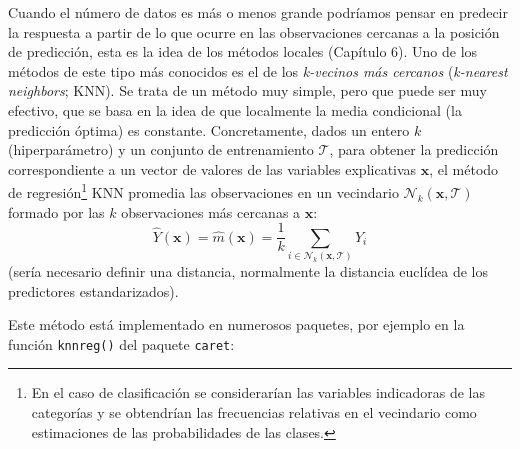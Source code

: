 \documentclass[
]{book}
\theoremstyle{break}
\theoremstyle{definition}
\theoremstyle{definition}
\theoremstyle{definition}
\theoremstyle{remark}
\begin{document}
Cuando el número de datos es más o menos grande podríamos pensar en predecir la respuesta a partir de lo que ocurre en las observaciones cercanas a la posición de predicción, esta es la idea de los métodos locales (Capítulo 6).
Uno de los métodos de este tipo más conocidos es el de los \emph{k-vecinos más cercanos} (\emph{k-nearest neighbors}; KNN).
Se trata de un método muy simple, pero que puede ser muy efectivo, que se basa en la idea de que localmente la media condicional (la predicción óptima) es constante.
Concretamente, dados un entero \(k\) (hiperparámetro) y un conjunto de entrenamiento \(\mathcal{T}\), para obtener la predicción correspondiente a un vector de valores de las variables explicativas \(\mathbf{x}\), el método de regresión\footnote{En el caso de clasificación se considerarían las variables indicadoras de las categorías y se obtendrían las frecuencias relativas en el vecindario como estimaciones de las probabilidades de las clases.} KNN promedia las observaciones en un vecindario \(\mathcal{N}_k(\mathbf{x}, \mathcal{T})\) formado por las \(k\) observaciones más cercanas a \(\mathbf{x}\):
\[\hat{Y}(\mathbf{x}) = \hat{m}(\mathbf{x}) = \frac{1}{k} \sum_{i \in \mathcal{N}_k(\mathbf{x}, \mathcal{T})} Y_i\]
(sería necesario definir una distancia, normalmente la distancia euclídea de los predictores estandarizados).

Este método está implementado en numerosos paquetes, por ejemplo en la función \texttt{knnreg()} del paquete \texttt{caret}:
\end{document}
